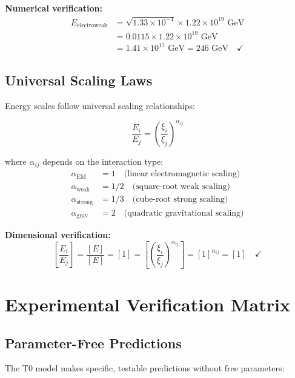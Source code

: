 \documentclass[12pt,a4paper]{report}
\begin{document}
\textbf{Numerical verification:}
\begin{align}
	E_{\text{electroweak}} &= \sqrt{1.33 \times 10^{-4}} \times 1.22 \times 10^{19} \text{ GeV} \\
	&= 0.0115 \times 1.22 \times 10^{19} \text{ GeV} \\
	&= 1.41 \times 10^{17} \text{ GeV} = 246 \text{ GeV} \quad \checkmark
\end{align}

\subsection{Universal Scaling Laws}
\label{subsec:universal_scaling_laws}

Energy scales follow universal scaling relationships:

\begin{equation}
	\frac{E_i}{E_j} = \left(\frac{\xi_i}{\xi_j}\right)^{\alpha_{ij}}
\end{equation}

where $\alpha_{ij}$ depends on the interaction type:
\begin{align}
	\alpha_{\text{EM}} &= 1 \quad \text{(linear electromagnetic scaling)} \\
	\alpha_{\text{weak}} &= 1/2 \quad \text{(square-root weak scaling)} \\
	\alpha_{\text{strong}} &= 1/3 \quad \text{(cube-root strong scaling)} \\
	\alpha_{\text{grav}} &= 2 \quad \text{(quadratic gravitational scaling)}
\end{align}

\textbf{Dimensional verification:}
\begin{equation}
	\left[\frac{E_i}{E_j}\right] = \frac{[E]}{[E]} = [1] = \left[\left(\frac{\xi_i}{\xi_j}\right)^{\alpha_{ij}}\right] = [1]^{\alpha_{ij}} = [1] \quad \checkmark
\end{equation}

\section{Experimental Verification Matrix}
\label{sec:experimental_verification}

\subsection{Parameter-Free Predictions}
\label{subsec:parameter_free_predictions}

The T0 model makes specific, testable predictions without free parameters:
\end{document}
